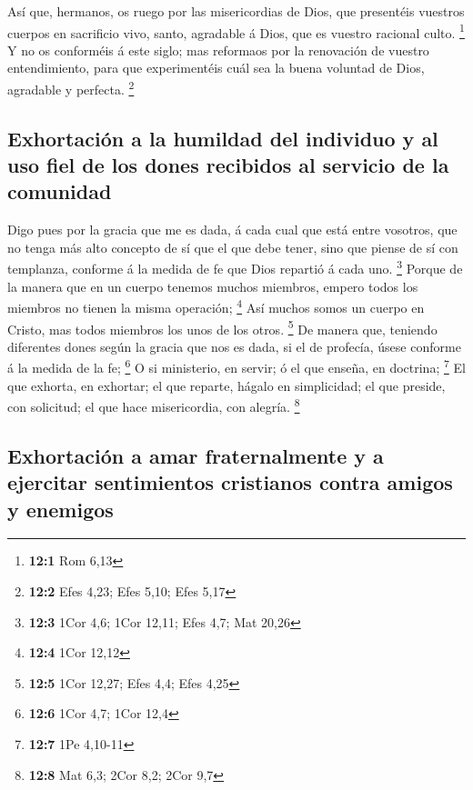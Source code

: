  Así que, hermanos, os ruego por las misericordias de
Dios, que presentéis vuestros cuerpos en sacrificio vivo, santo,
agradable á Dios, que es vuestro racional culto. \footnote{\textbf{12:1}
  Rom 6,13}  Y no os conforméis á este siglo; mas
reformaos por la renovación de vuestro entendimiento, para que
experimentéis cuál sea la buena voluntad de Dios, agradable y perfecta.
\footnote{\textbf{12:2} Efes 4,23; Efes 5,10; Efes 5,17}

\hypertarget{exhortaciuxf3n-a-la-humildad-del-individuo-y-al-uso-fiel-de-los-dones-recibidos-al-servicio-de-la-comunidad}{%
\subsection{Exhortación a la humildad del individuo y al uso fiel de los
dones recibidos al servicio de la
comunidad}\label{exhortaciuxf3n-a-la-humildad-del-individuo-y-al-uso-fiel-de-los-dones-recibidos-al-servicio-de-la-comunidad}}

 Digo pues por la gracia que me es dada, á cada cual que
está entre vosotros, que no tenga más alto concepto de sí que el que
debe tener, sino que piense de sí con templanza, conforme á la medida de
fe que Dios repartió á cada uno. \footnote{\textbf{12:3} 1Cor 4,6; 1Cor
  12,11; Efes 4,7; Mat 20,26}  Porque de la manera que en
un cuerpo tenemos muchos miembros, empero todos los miembros no tienen
la misma operación; \footnote{\textbf{12:4} 1Cor 12,12} 
Así muchos somos un cuerpo en Cristo, mas todos miembros los unos de los
otros. \footnote{\textbf{12:5} 1Cor 12,27; Efes 4,4; Efes 4,25}
 De manera que, teniendo diferentes dones según la gracia
que nos es dada, si el de profecía, úsese conforme á la medida de la fe;
\footnote{\textbf{12:6} 1Cor 4,7; 1Cor 12,4}  O si
ministerio, en servir; ó el que enseña, en doctrina; \footnote{\textbf{12:7}
  1Pe 4,10-11}  El que exhorta, en exhortar; el que
reparte, hágalo en simplicidad; el que preside, con solicitud; el que
hace misericordia, con alegría. \footnote{\textbf{12:8} Mat 6,3; 2Cor
  8,2; 2Cor 9,7}

\hypertarget{exhortaciuxf3n-a-amar-fraternalmente-y-a-ejercitar-sentimientos-cristianos-contra-amigos-y-enemigos}{%
\subsection{Exhortación a amar fraternalmente y a ejercitar sentimientos
cristianos contra amigos y
enemigos}\label{exhortaciuxf3n-a-amar-fraternalmente-y-a-ejercitar-sentimientos-cristianos-contra-amigos-y-enemigos}}

